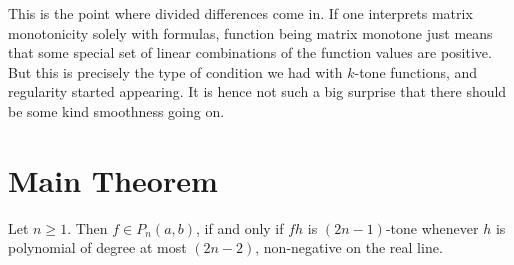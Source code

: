 This is the point where divided differences come in. If one interprets matrix monotonicity solely with formulas, function being matrix monotone just means that some special set of linear combinations of the function values are positive. But this is precisely the type of condition we had with $k$-tone functions, and regularity started appearing. It is hence not such a big surprise that there should be some kind smoothness going on.

\section{Main Theorem}

\begin{lause}\label{main_theorem}
	Let $n \geq 1$. Then $f \in P_{n}(a, b)$, if and only if $f h$ is $(2 n - 1)$-tone whenever $h$ is polynomial of degree at most $(2 n - 2)$, non-negative on the real line. 
\end{lause}
